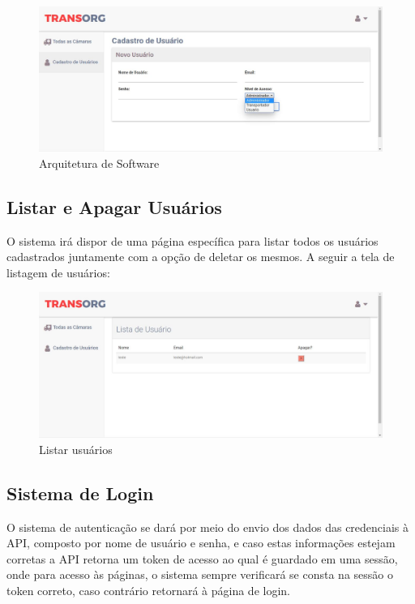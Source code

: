 \begin{figure}[H]
\centering
\includegraphics[width=16cm]{figuras/cadastro_software.JPG}
\caption{Arquitetura de Software}
\end{figure}

\subsection{Listar e Apagar Usuários}
	O sistema irá dispor de uma página específica para listar todos os usuários cadastrados juntamente com a opção de deletar os mesmos. A seguir a tela de listagem de usuários:

\begin{figure}[H]
\centering
\includegraphics[width=16cm]{figuras/listaUsuarios_software.JPG}
\caption{Listar usuários}
\end{figure}

\subsection{Sistema de Login}
	O sistema de autenticação se dará por meio do envio dos dados das credenciais à API, composto por nome de usuário e senha, e caso estas informações estejam corretas a API retorna um token de acesso ao qual é guardado em uma sessão, onde para acesso às páginas, o sistema sempre verificará se consta na sessão o token correto, caso contrário retornará à página de login. 
	
